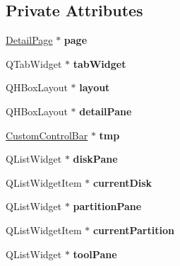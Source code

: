 \subsection*{Private Attributes}
\begin{DoxyCompactItemize}
\item 
\mbox{\label{class_main_window_a85aca5dff12a58a98fed2a781bc90144}} 
\mbox{\hyperlink{class_detail_page}{Detail\+Page}} $\ast$ {\bfseries page}
\item 
\mbox{\label{class_main_window_a545e481058060c9fdf9ba6566b98e641}} 
Q\+Tab\+Widget $\ast$ {\bfseries tab\+Widget}
\item 
\mbox{\label{class_main_window_ae1b151a79d93313a31bc76c3ffb37a4c}} 
Q\+H\+Box\+Layout $\ast$ {\bfseries layout}
\item 
\mbox{\label{class_main_window_a4ef02c79dd339d13f836aaf268b6bd50}} 
Q\+H\+Box\+Layout $\ast$ {\bfseries detail\+Pane}
\item 
\mbox{\label{class_main_window_aa981569cad600f9bf9e38eb708b77e0a}} 
\mbox{\hyperlink{class_custom_control_bar}{Custom\+Control\+Bar}} $\ast$ {\bfseries tmp}
\item 
\mbox{\label{class_main_window_a9b4044fa84d1c1e35a76ba6977d640b2}} 
Q\+List\+Widget $\ast$ {\bfseries disk\+Pane}
\item 
\mbox{\label{class_main_window_ac01415060808803d2f2b5b2055d21c71}} 
Q\+List\+Widget\+Item $\ast$ {\bfseries current\+Disk}
\item 
\mbox{\label{class_main_window_a2f6788d49fb2f6ddf90e122a42309abc}} 
Q\+List\+Widget $\ast$ {\bfseries partition\+Pane}
\item 
\mbox{\label{class_main_window_a90321224ad4be8bca64d6046e94fc204}} 
Q\+List\+Widget\+Item $\ast$ {\bfseries current\+Partition}
\item 
\mbox{\label{class_main_window_a9dedf62dfeafc8d6047be8f90966c62c}} 
Q\+List\+Widget $\ast$ {\bfseries tool\+Pane}

\end{DoxyCompactItemize}
